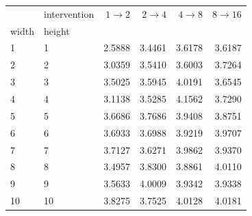 \begin{tabular}{llrrrr}
\toprule
   & intervention &  $1 \to 2$ &  $2 \to 4$ &  $4 \to 8$ &  $8 \to 16$ \\
width & height &            &            &            &             \\
\midrule
1  & 1  &     2.5888 &     3.4461 &     3.6178 &      3.6187 \\
2  & 2  &     3.0359 &     3.5410 &     3.6003 &      3.7264 \\
3  & 3  &     3.5025 &     3.5945 &     4.0191 &      3.6545 \\
4  & 4  &     3.1138 &     3.5285 &     4.1562 &      3.7290 \\
5  & 5  &     3.6686 &     3.7686 &     3.9408 &      3.8751 \\
6  & 6  &     3.6933 &     3.6988 &     3.9219 &      3.9707 \\
7  & 7  &     3.7127 &     3.6271 &     3.9862 &      3.9370 \\
8  & 8  &     3.4957 &     3.8300 &     3.8861 &      4.0110 \\
9  & 9  &     3.5633 &     4.0009 &     3.9342 &      3.9338 \\
10 & 10 &     3.8275 &     3.7525 &     4.0128 &      4.0181 \\
\bottomrule
\end{tabular}
